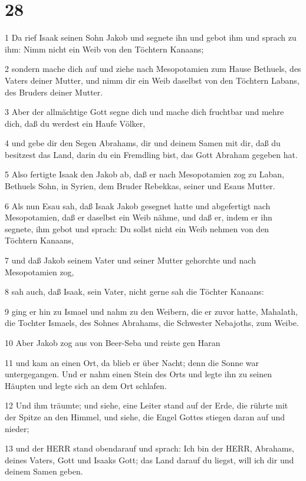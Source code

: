 \chapter{28}

\par 1 Da rief Isaak seinen Sohn Jakob und segnete ihn und gebot ihm und sprach zu ihm: Nimm nicht ein Weib von den Töchtern Kanaans;
\par 2 sondern mache dich auf und ziehe nach Mesopotamien zum Hause Bethuels, des Vaters deiner Mutter, und nimm dir ein Weib daselbst von den Töchtern Labans, des Bruders deiner Mutter.
\par 3 Aber der allmächtige Gott segne dich und mache dich fruchtbar und mehre dich, daß du werdest ein Haufe Völker,
\par 4 und gebe dir den Segen Abrahams, dir und deinem Samen mit dir, daß du besitzest das Land, darin du ein Fremdling bist, das Gott Abraham gegeben hat.
\par 5 Also fertigte Isaak den Jakob ab, daß er nach Mesopotamien zog zu Laban, Bethuels Sohn, in Syrien, dem Bruder Rebekkas, seiner und Esaus Mutter.
\par 6 Als nun Esau sah, daß Isaak Jakob gesegnet hatte und abgefertigt nach Mesopotamien, daß er daselbst ein Weib nähme, und daß er, indem er ihn segnete, ihm gebot und sprach: Du sollst nicht ein Weib nehmen von den Töchtern Kanaans,
\par 7 und daß Jakob seinem Vater und seiner Mutter gehorchte und nach Mesopotamien zog,
\par 8 sah auch, daß Isaak, sein Vater, nicht gerne sah die Töchter Kanaans:
\par 9 ging er hin zu Ismael und nahm zu den Weibern, die er zuvor hatte, Mahalath, die Tochter Ismaels, des Sohnes Abrahams, die Schwester Nebajoths, zum Weibe.
\par 10 Aber Jakob zog aus von Beer-Seba und reiste gen Haran
\par 11 und kam an einen Ort, da blieb er über Nacht; denn die Sonne war untergegangen. Und er nahm einen Stein des Orts und legte ihn zu seinen Häupten und legte sich an dem Ort schlafen.
\par 12 Und ihm träumte; und siehe, eine Leiter stand auf der Erde, die rührte mit der Spitze an den Himmel, und siehe, die Engel Gottes stiegen daran auf und nieder;
\par 13 und der HERR stand obendarauf und sprach: Ich bin der HERR, Abrahams, deines Vaters, Gott und Isaaks Gott; das Land darauf du liegst, will ich dir und deinem Samen geben.
